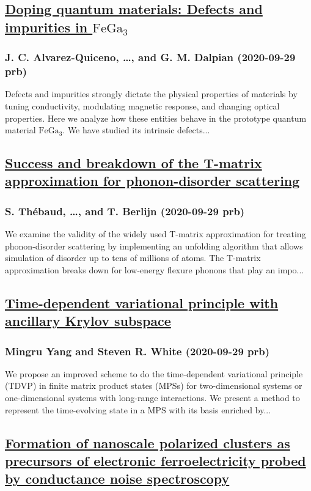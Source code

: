 \subsection*{\href{http://link.aps.org/doi/10.1103/PhysRevB.102.094110}{Doping quantum materials: Defects and impurities in $\mathrm{Fe}{\mathrm{Ga}}_{3}$}}
\subsubsection*{J. C. Alvarez-Quiceno, \dots, and G. M. Dalpian (2020-09-29 prb)}
Defects and impurities strongly dictate the physical properties of materials by tuning conductivity, modulating magnetic response, and changing optical properties. Here we analyze how these entities behave in the prototype quantum material ${\mathrm{FeGa}}_{3}$. We have studied its intrinsic defects...
\subsection*{\href{http://link.aps.org/doi/10.1103/PhysRevB.102.094206}{Success and breakdown of the T-matrix approximation for phonon-disorder scattering}}
\subsubsection*{S. Thébaud, \dots, and T. Berlijn (2020-09-29 prb)}
We examine the validity of the widely used T-matrix approximation for treating phonon-disorder scattering by implementing an unfolding algorithm that allows simulation of disorder up to tens of millions of atoms. The T-matrix approximation breaks down for low-energy flexure phonons that play an impo...
\subsection*{\href{http://link.aps.org/doi/10.1103/PhysRevB.102.094315}{Time-dependent variational principle with ancillary Krylov subspace}}
\subsubsection*{Mingru Yang and Steven R. White (2020-09-29 prb)}
We propose an improved scheme to do the time-dependent variational principle (TDVP) in finite matrix product states (MPSs) for two-dimensional systems or one-dimensional systems with long-range interactions. We present a method to represent the time-evolving state in a MPS with its basis enriched by...
\subsection*{\href{http://link.aps.org/doi/10.1103/PhysRevB.102.100103}{Formation of nanoscale polarized clusters as precursors of electronic ferroelectricity probed by conductance noise spectroscopy}}
